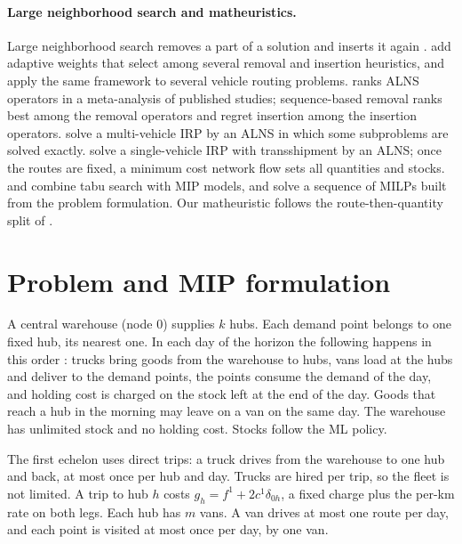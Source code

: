 \documentclass[11pt,a4paper]{article}
\begin{document}
\paragraph{Large neighborhood search and matheuristics.}
Large neighborhood search removes a part of a solution and inserts it again
\citep{shaw1998using}. \citet{ropke2006adaptive} add adaptive weights that select among several
removal and insertion heuristics, and \citet{pisinger2007general} apply the same framework to
several vehicle routing problems. \citet{voigt2025review} ranks ALNS operators in a meta-analysis of published
studies; sequence-based removal ranks best among the removal operators and regret insertion among
the insertion operators.
\citet{coelho2012consistency} solve a multi-vehicle IRP by an ALNS in which some subproblems are
solved exactly. \citet{coelho2012transshipment} solve a single-vehicle IRP with transshipment by an
ALNS; once the routes are fixed, a minimum cost network flow sets all quantities and stocks.
\citet{archetti2012hybrid} and \citet{archetti2017matheuristic} combine tabu search with MIP
models, and \citet{solyali2022effective} solve a sequence of MILPs built from the problem
formulation. Our matheuristic follows the route-then-quantity split of
\citet{coelho2012transshipment}.

\section{Problem and MIP formulation}\label{sec:model}

A central warehouse (node 0) supplies $k$ hubs. Each demand point belongs to one fixed hub, its
nearest one. In each day of the horizon the following happens in this order
\citep{charaf2024branch}: trucks bring goods from the warehouse to hubs, vans load at the hubs and
deliver to the demand points, the points consume the demand of the day, and holding cost is charged
on the stock left at the end of the day. Goods that reach a hub in the morning may leave on a van
on the same day. The warehouse has unlimited stock and no holding cost. Stocks follow the ML policy.

The first echelon uses direct trips: a truck drives from the warehouse to one hub and back, at most
once per hub and day. Trucks are hired per trip, so the fleet is not limited. A trip to hub $h$
costs $g_h = f^1 + 2c^1\delta_{0h}$, a fixed charge plus the per-km rate on both legs. Each hub has
$m$ vans. A van drives at most one route per day, and each point is visited at most once per day,
by one van.
\end{document}
